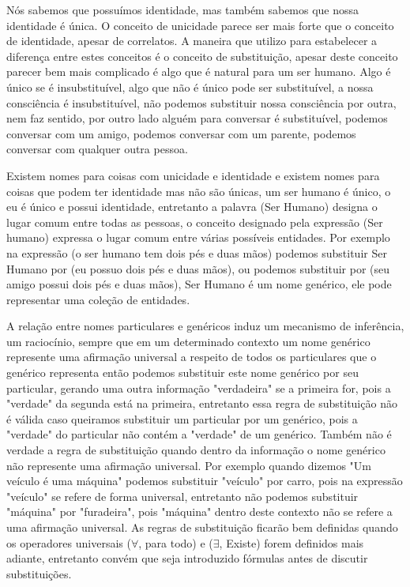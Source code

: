 \documentclass[10pt,a4paper]{report}
\begin{document}
Nós sabemos que possuímos identidade, mas também sabemos que nossa identidade é única. O conceito de unicidade parece ser mais forte que o conceito de identidade, apesar de correlatos. A maneira que utilizo para estabelecer a diferença entre estes conceitos é o conceito de substituição, apesar deste conceito parecer bem mais complicado é algo que é natural para um ser humano. Algo é único se é insubstituível, algo que não é único pode ser substituível, a nossa consciência é insubstituível, não podemos substituir nossa consciência por outra, nem faz sentido, por outro lado alguém para conversar é substituível, podemos conversar com um amigo, podemos conversar com um parente, podemos conversar com qualquer outra pessoa.

\hspace{\baselineskip}

Existem nomes para coisas com unicidade e identidade e existem nomes para coisas que podem ter identidade mas não são únicas, um ser humano é único, o eu é único e possui identidade, entretanto a palavra (Ser Humano) designa o lugar comum entre todas as pessoas, o conceito designado pela expressão (Ser humano) expressa o lugar comum entre várias possíveis entidades. Por exemplo na expressão (o ser humano tem dois pés e duas mãos) podemos substituir Ser Humano por (eu possuo dois pés e duas mãos), ou podemos substituir por (seu amigo possui dois pés e duas mãos), Ser Humano é um nome genérico, ele pode representar uma coleção de entidades.

\hspace{\baselineskip}

A relação entre nomes particulares e genéricos induz um mecanismo de inferência, um raciocínio, sempre que em um determinado contexto um nome genérico represente uma afirmação universal a respeito de todos os particulares que o genérico representa então podemos substituir este nome genérico por seu particular, gerando uma outra informação "verdadeira" se a primeira for, pois a "verdade" da segunda está na primeira, entretanto essa regra de substituição não é válida caso queiramos substituir um particular por um genérico, pois a "verdade" do particular não contém a "verdade" de um genérico. Também não é verdade a regra de substituição quando dentro da informação o nome genérico não represente uma afirmação universal. Por exemplo quando dizemos "Um veículo é uma máquina" podemos substituir "veículo" por carro, pois na expressão "veículo" se refere de forma universal, entretanto não podemos substituir "máquina" por "furadeira", pois "máquina" dentro deste contexto não se refere a uma afirmação universal. As regras de substituição ficarão bem definidas quando os operadores universais ($\forall$, para todo) e ($\exists$, Existe) forem definidos mais adiante, entretanto convém que seja introduzido fórmulas antes de discutir substituições.\\
\end{document}
